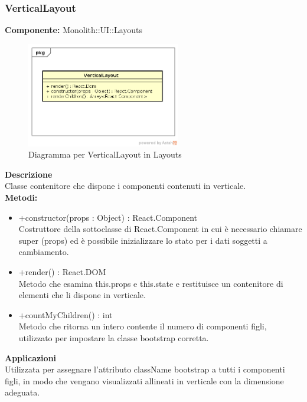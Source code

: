 \subsubsection{VerticalLayout}
\textbf{Componente:}  Monolith::UI::Layouts\\
   \FloatBarrier
   \begin{figure}[ht]
   \centering
   \includegraphics[width=0.6\textwidth]{img/single-VerticalLayout.png}
   \caption{{Diagramma per VerticalLayout in Layouts}}
\end{figure}
\FloatBarrier
\textbf{Descrizione}\\
Classe contenitore che dispone i componenti contenuti in verticale. \\
\textbf{Metodi:}
\begin{itemize}

\item +constructor(props : Object) : React.Component 
\\
Costruttore della sottoclasse di React.Component in cui è necessario chiamare super (props) ed è possibile inizializzare lo stato per i dati soggetti a cambiamento.

\item +render() : React.DOM 
\\
Metodo che esamina this.props e this.state e restituisce un contenitore di elementi che li dispone in verticale.

\item +countMyChildren() : int
\\
Metodo che ritorna un intero contente il numero di componenti figli, utilizzato per impostare la classe bootstrap corretta.

\end{itemize} 


\textbf{Applicazioni}\\
Utilizzata per assegnare l'attributo className bootstrap a tutti i componenti figli, in modo che vengano visualizzati allineati in verticale con la dimensione adeguata. 


